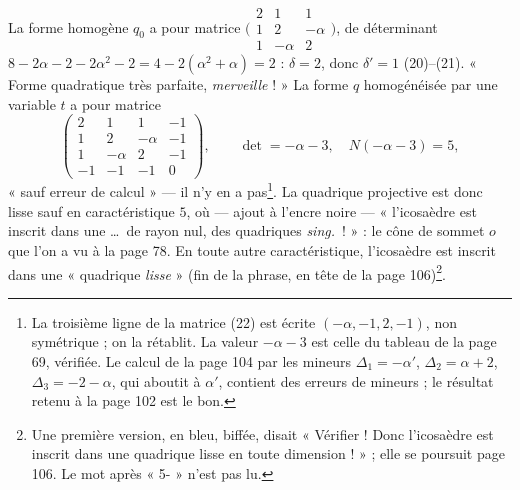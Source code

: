 \documentclass[11pt,a4paper]{article}
\begin{document}
La forme homogène $q_0$ a pour matrice $\bigl(\begin{smallmatrix} 2 & 1 & 1 \\ 1
& 2 & -\alpha \\ 1 & -\alpha & 2 \end{smallmatrix}\bigr)$, de déterminant $8 -
2\alpha - 2 - 2\alpha^2 - 2 = 4 - 2(\alpha^2 + \alpha) = 2$ : $\delta = 2$, donc
$\delta' = 1$ (20)--(21). « Forme quadratique très parfaite, \emph{merveille}
! » La forme $q$ homogénéisée par une variable $t$ a pour matrice
\[
\begin{pmatrix} 2 & 1 & 1 & -1 \\ 1 & 2 & -\alpha & -1 \\ 1 & -\alpha & 2 & -1 \\ -1
& -1 & -1 & 0 \end{pmatrix}, \qquad \det = -\alpha - 3, \quad N(-\alpha - 3) = 5 ,
\]
« sauf erreur de calcul » --- il n'y en a pas\footnote{La troisième ligne de
la matrice (22) est écrite $(-\alpha, -1, 2, -1)$, non symétrique ; on la
rétablit. La valeur $-\alpha - 3$ est celle du tableau de la page 69,
vérifiée. Le calcul de la page 104 par les mineurs $\Delta_1 = -\alpha'$,
$\Delta_2 = \alpha + 2$, $\Delta_3 = -2 - \alpha$, qui aboutit à $\alpha'$,
contient des erreurs de mineurs ; le résultat retenu à la page 102 est le
bon.}. La quadrique projective est donc lisse sauf en caractéristique $5$, où
--- ajout à l'encre noire --- « l'icosaèdre est inscrit dans une \ldots\ de
rayon nul, des quadriques \emph{sing.}\ ! » : le cône de sommet $o$ que l'on a
vu à la page 78. En toute autre caractéristique, l'icosaèdre est inscrit dans
une « quadrique \emph{lisse} » (fin de la phrase, en tête de la page
106)\footnote{Une première version, en bleu, biffée, disait « Vérifier ! Donc
l'icosaèdre est inscrit dans une quadrique lisse en toute dimension ! » ; elle
se poursuit page 106. Le mot après « 5- » n'est pas lu.}.
\end{document}
